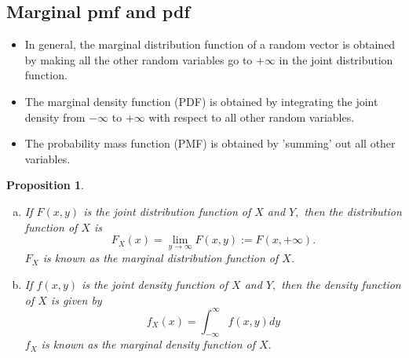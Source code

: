 \documentclass[12pt]{report} \addtolength{\textheight}{2in}
\newtheorem{prop}{Proposition}
\newcommand{\totalint}{\int_{-\infty}^{\infty}}
\begin{document}
\subsection*{Marginal pmf and pdf}
\begin{itemize}
\item In general, the marginal distribution function of a random vector is obtained by making all the other random variables go to $+ \infty$ in the  joint distribution function.
\item The marginal density function (PDF) is obtained by integrating the joint density from $- \infty $ to $+ \infty$ with respect to all other random variables.
\item The probability mass function (PMF) is obtained by 'summing' out all other variables.
\end{itemize}
\begin{prop}
\begin{enumerate} [(a)]
\item If $F(x,y)$ is the joint distribution function of $X$ and $Y,$ then the distribution function of $X$ is
\begin{displaymath}
F_X(x)=\lim_{y\to \infty} F(x,y) :=F(x,+\infty).
\end{displaymath}
$F_X$ is known as the marginal distribution function of $X$.
\item If $f(x,y)$ is the joint density function of $X$ and $Y,$ then the density function of $X$ is given by
\begin{displaymath}
f_X(x)=\totalint f(x,y) dy
\end{displaymath}
$f_X$ is known as the marginal density function of $X.$
\end{enumerate}
\end{prop}
\end{document}
